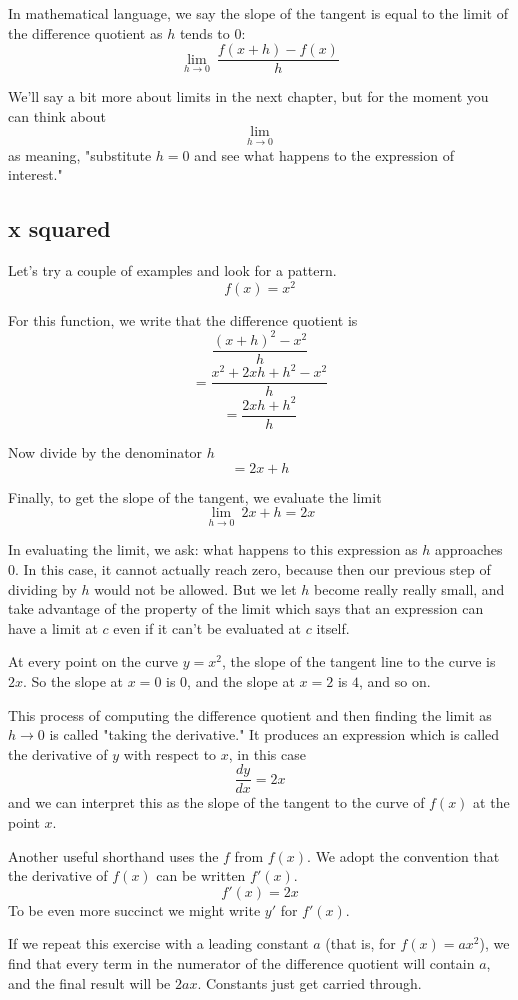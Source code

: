 \documentclass[11pt, oneside]{article}
\begin{document}
In mathematical language, we say the slope of the tangent is equal to the limit of the difference quotient as $h$ tends to $0$:
\[  \lim_{h \to 0} \  \frac{f(x+h) - f(x)}{h} \]

We'll say a bit more about limits in the next chapter, but for the moment you can think about 
\[  \lim_{h \to 0} \]
as meaning, "substitute $h=0$ and see what happens to the expression of interest."

\subsection*{x squared}

Let's try a couple of examples and look for a pattern.
\[    f(x)=x^2  \]

For this function, we write that the difference quotient is
\[    \frac{(x+h)^2 - x^2}{h} \]
\[    = \frac{x^2 + 2xh + h^2 - x^2}{h} \]
\[    = \frac{2xh + h^2}{h} \]

Now divide by the denominator $h$
\[    = 2x + h \]
    
Finally, to get the slope of the tangent, we evaluate the limit
\[    \lim_{h \to 0} \  2x + h = 2x \]

In evaluating the limit, we ask:  what happens to this expression as $h$ approaches $0$.  In this case, it cannot actually reach zero, because then our previous step of dividing by $h$ would not be allowed.  But we let $h$ become really really small, and take advantage of the property of the limit which says that an expression can have a limit at $c$ even if it can't be evaluated at $c$ itself.

At every point on the curve $y=x^2$, the slope of the tangent line to the curve is $2x$.  So the slope at $x=0$ is $0$, and the slope at $x=2$ is $4$, and so on.

This process of computing the difference quotient and then finding the limit as $h \to 0$ is called "taking the derivative."  It produces an expression which is called the derivative of $y$ with respect to $x$, in this case
\[   \frac{dy}{dx} = 2x \]
and we can interpret this as the slope of the tangent to the curve of $f(x)$ at the point $x$.

Another useful shorthand uses the $f$ from $f(x)$.  We adopt the convention that the derivative of $f(x)$ can be written $f'(x)$.
\[    f'(x) = 2x \]
To be even more succinct we might write $y'$ for $f'(x)$.

If we repeat this exercise with a leading constant $a$ (that is, for $f(x) = ax^2$), we find that every term in the numerator of the difference quotient will contain $a$, and the final result will be $2ax$.  Constants just get carried through.
\end{document}
